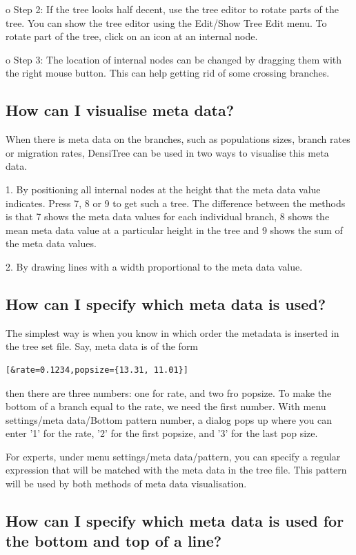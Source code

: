 \documentclass{article}
\begin{document}
\noindent o Step 2: If the tree looks half decent, use the tree editor to rotate parts of the
tree. You can show the tree editor using the Edit/Show Tree Edit menu. To rotate part of the
tree, click on an icon at an internal node.

\noindent o Step 3: The location of internal nodes can be changed by dragging them with
the right mouse button. This can help getting rid of some crossing branches.

\subsection{How can I visualise meta data?}

When there is meta data on the branches, such as populations sizes, branch rates or migration rates,
DensiTree can be used in two ways to visualise this meta data.

1. By positioning all internal nodes at the height that the meta data value indicates.
Press 7, 8 or 9 to get such a tree. The difference between the methods is that
7 shows the meta data values for each individual branch, 8 shows the mean meta data value
at a particular height in the tree and 9 shows the sum of the meta data values.

2. By drawing lines with a width proportional to the meta data value.

\subsection{How can I specify which meta data is used?}

The simplest way is when you know in which order the metadata is inserted in the tree set file.
Say, meta data is of the form \begin{verbatim}[&rate=0.1234,popsize={13.31, 11.01}]\end{verbatim}
then there are three numbers: one for rate, and two fro popsize. To make the bottom of a branch
equal to the rate, we need the first number. With menu settings/meta data/Bottom pattern number,
a dialog pops up where you can enter '1' for the rate, '2' for the first popsize, and '3' for
the last pop size.

For experts, under menu settings/meta data/pattern, you can specify a regular expression that will be matched
with the meta data in the tree file. This pattern will be used by both methods of meta data
visualisation.

\subsection{How can I specify which meta data is used for the bottom and top of a line?}
\end{document}
